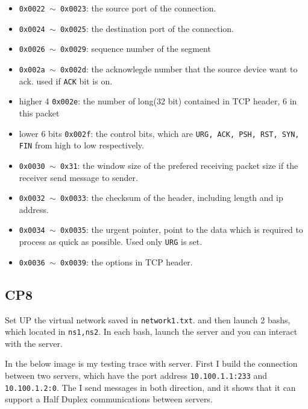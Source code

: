 \documentclass[11pt]{article}
\begin{document}
	\begin{itemize}
		\item \texttt{0x0022 $\sim$ 0x0023}: the source port of the connection.
		
		\item \texttt{0x0024 $\sim$ 0x0025}: the destination port of the connection.
		
		
		\item \texttt{0x0026 $\sim$ 0x0029}: sequence number of the segment
		
		
		\item \texttt{0x002a $\sim$ 0x002d}: the acknowlegde number that the source device want to ack. used if \texttt{ACK} bit is on.
		
		\item higher 4 \texttt{0x002e}: the number of long(32 bit) contained in TCP header, $6$ in this packet
		
		\item lower 6 bits \texttt{0x002f}: the control bits, which are \texttt{URG, ACK, PSH, RST, SYN, FIN} from high to low respectively.
		
		\item  \texttt{0x0030 $\sim$ 0x31}: the window size of the prefered receiving packet size if the receiver send message to sender.
		
		\item  \texttt{0x0032 $\sim$ 0x0033}: the checksum of the header, including length and ip address.
		
		\item  \texttt{0x0034 $\sim$ 0x0035}: the urgent pointer, point to the data which is required to process as quick as possible. Used only \texttt{URG} is set.
		
		\item  \texttt{0x0036 $\sim$ 0x0039}: the options in TCP header.
		
		
	\end{itemize}
	
	\subsection*{CP8}
	
	\par Set UP the virtual network saved in \texttt{network1.txt}. and then launch 2 bashs, which located in \texttt{ns1,ns2}. In each bash, launch the server and you can interact with the server.
	
	\par In the below image is my testing trace with server. First I build the connection between two servers, which have the port address \texttt{10.100.1.1:233} and \texttt{10.100.1.2:0}. The I send messages in both direction, and it shows that it can support a Half Duplex communications between servers. 
	
\end{document}
